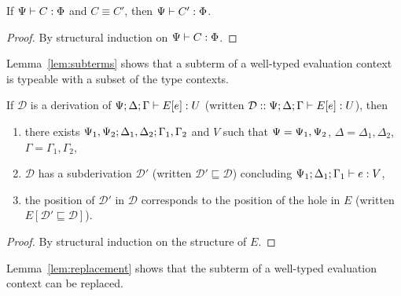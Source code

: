 \begin{lemma}\label{lem:equiv}
  If $\Psi |- C : \Phi$ and $C \equiv C'$, then $\Psi |- C' : \Phi$.
  \begin{proof}
    By structural induction on $\Psi |- C : \Phi$.
  \end{proof}
\end{lemma}

Lemma~\ref{lem:subterms} shows that a subterm of a well-typed evaluation context
is typeable with a subset of the type contexts. 

\begin{lemma}\label{lem:subterms}
  If $\mathcal{D}$ is a derivation of $\Psi;\Delta; \Gamma |- E[e] : U$ (written $\mathcal{D}
  :: \Psi;\Delta;\Gamma |- E[e] : U$), then
  \begin{enumerate}
    \item there exists $\Psi_1,\Psi_2;\Delta_1, \Delta_2; \Gamma_1,\Gamma_2$ and $V$ such that
      $\Psi = \Psi_1,\Psi_2$, $\Delta = \Delta_1,\Delta_2$, $\Gamma =
      \Gamma_1,\Gamma_2$,
    \item $\mathcal{D}$ has a subderivation $\mathcal{D}'$ (written
      $\mathcal{D}' \sqsubseteq \mathcal{D}$) concluding $\Psi_1;\Delta_1;\Gamma_1 |- e : V$,
    \item the position of $\mathcal{D}'$ in $\mathcal{D}$ corresponds to the
      position of the hole in $E$ (written $E[\mathcal{D}' \sqsubseteq \mathcal{D}]$).
  \end{enumerate}
  \begin{proof}
    By structural induction on the structure of $E$.
  \end{proof}
\end{lemma}


Lemma~\ref{lem:replacement} shows that the subterm of a well-typed evaluation
context can be replaced.

